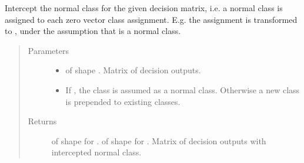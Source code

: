 \documentclass[letterpaper,10pt,english]{sphinxmanual}
\begin{document}

\begin{fulllineitems}
\label{\detokenize{pusion.util.transformer:pusion.util.transformer.intercept_normal_class}}
\sphinxAtStartPar
Intercept the normal class for the given decision matrix, i.e. a normal class is assigned to each zero vector
class assignment. E.g. the assignment \sphinxtitleref{{[}0,0,0,0{]}} is transformed to \sphinxtitleref{{[}1,0,0,0{]}}, under the assumption that 
is a normal class.
\begin{quote}\begin{description}
\item[{Parameters}] \leavevmode\begin{itemize}
\item {} 
\sphinxAtStartPar
{} \textendash{}  of shape . Matrix of decision outputs.

\item {} 
\sphinxAtStartPar
{} \textendash{} If , the class  is assumed as a normal class. Otherwise a new class is prepended to
existing classes.

\end{itemize}

\item[{Returns}] \leavevmode
\sphinxAtStartPar
{} of shape  for .
 of shape  for .
Matrix of decision outputs with intercepted normal class.

\end{description}\end{quote}

\end{fulllineitems}

\end{document}
